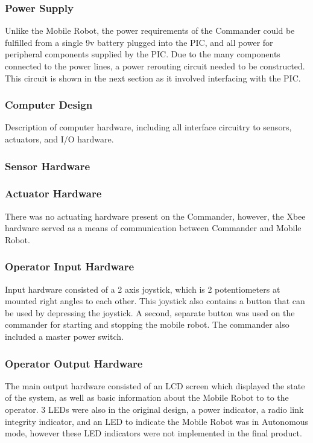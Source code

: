 \documentclass[11pt,a4paper]{article}
\begin{document}
    \subsubsection{Power Supply}
      Unlike the Mobile Robot, the power requirements of the Commander could be fulfilled from a single 9v battery plugged into the PIC, and all power for peripheral components supplied by the PIC. Due to the many components connected to the power lines, a power rerouting circuit needed to be constructed. This circuit is shown in the next section as it involved interfacing with the PIC.
    \subsubsection{Computer Design}
      Description of computer hardware, including all interface circuitry to sensors, actuators, and I/O hardware.
    \subsubsection{Sensor Hardware}
    \subsubsection{Actuator Hardware}
      There was no actuating hardware present on the Commander, however, the Xbee hardware served as a means of communication between Commander and Mobile Robot.
    \subsubsection{Operator Input Hardware}
      Input hardware consisted of a 2 axis joystick, which is 2 potentiometers at mounted right angles to each other. This joystick also contains a button that can be used by depressing the joystick. A second, separate button was used on the commander for starting and stopping the mobile robot. The commander also included a master power switch.
    \subsubsection{Operator Output Hardware}
      The main output hardware consisted of an LCD screen which displayed the state of the system, as well as basic information about the Mobile Robot to to the operator. 3 LEDs were also in the original design, a power indicator, a radio link integrity indicator, and an LED to indicate the Mobile Robot was in Autonomous mode, however these LED indicators were not implemented in the final product.
\end{document}
